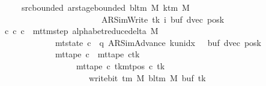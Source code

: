 \begin{isabellebody}
\ \ \ \ \ \ \ src{\isacharunderscore}{\kern0pt}bounded{\isacharcolon}{\kern0pt}\ {\isachardoublequoteopen}ar{\isacharunderscore}{\kern0pt}stage{\isacharunderscore}{\kern0pt}bounded\ {\isacharparenleft}{\kern0pt}bl{\isacharunderscore}{\kern0pt}tm\ M{\isacharparenright}{\kern0pt}\ {\isacharparenleft}{\kern0pt}k{\isacharunderscore}{\kern0pt}tm\ M{\isacharparenright}{\kern0pt}\isanewline
\ \ \ \ \ \ \ \ \ \ \ \ \ \ \ \ \ \ \ \ \ \ \ \ \ \ {\isacharparenleft}{\kern0pt}AR{\isacharunderscore}{\kern0pt}SimWrite{\isacharcomma}{\kern0pt}\ tk{\isacharcomma}{\kern0pt}\ i{\isacharcomma}{\kern0pt}\ buf{\isacharcomma}{\kern0pt}\ dvec{\isacharcomma}{\kern0pt}\ posk{\isacharparenright}{\kern0pt}{\isachardoublequoteclose}\isanewline
\ \ \ {\isachardoublequoteopen}{\isasymexists}c{\isacharprime}{\kern0pt}{\isacharprime}{\kern0pt}{\isachardot}{\kern0pt}\ {\isacharparenleft}{\kern0pt}c{\isacharprime}{\kern0pt}{\isacharcomma}{\kern0pt}\ c{\isacharprime}{\kern0pt}{\isacharprime}{\kern0pt}{\isacharparenright}{\kern0pt}\ {\isasymin}\ mttm{\isacharunderscore}{\kern0pt}step\ {\isacharparenleft}{\kern0pt}alphabet{\isacharunderscore}{\kern0pt}reduce{\isacharunderscore}{\kern0pt}delta\ M{\isacharparenright}{\kern0pt}\isanewline
\ \ \ \ \ \ \ \ \ \ \ \ \ \ {\isasymand}\ mt{\isacharunderscore}{\kern0pt}state\ c{\isacharprime}{\kern0pt}{\isacharprime}{\kern0pt}\ {\isacharequal}{\kern0pt}\ {\isacharparenleft}{\kern0pt}q{\isacharcomma}{\kern0pt}\ AR{\isacharunderscore}{\kern0pt}SimAdvance{\isacharcomma}{\kern0pt}\ k{\isacharunderscore}{\kern0pt}unidx\ {}{\isacharcomma}{\kern0pt}\ {}{\isacharcomma}{\kern0pt}\ buf{\isacharcomma}{\kern0pt}\ dvec{\isacharcomma}{\kern0pt}\ posk{\isacharparenright}{\kern0pt}\isanewline
\ \ \ \ \ \ \ \ \ \ \ \ \ \ {\isasymand}\ mt{\isacharunderscore}{\kern0pt}tape\ c{\isacharprime}{\kern0pt}{\isacharprime}{\kern0pt}\ {\isacharequal}{\kern0pt}\ {\isacharparenleft}{\kern0pt}mt{\isacharunderscore}{\kern0pt}tape\ c{\isacharprime}{\kern0pt}{\isacharparenright}{\kern0pt}{\isacharparenleft}{\kern0pt}tk\ {\isacharcolon}{\kern0pt}{\isacharequal}{\kern0pt}\isanewline
\ \ \ \ \ \ \ \ \ \ \ \ \ \ \ \ \ \ \ \ {\isacharparenleft}{\kern0pt}mt{\isacharunderscore}{\kern0pt}tape\ c{\isacharprime}{\kern0pt}\ tk{\isacharparenright}{\kern0pt}{\isacharparenleft}{\kern0pt}mt{\isacharunderscore}{\kern0pt}pos\ c{\isacharprime}{\kern0pt}\ tk\ {\isacharcolon}{\kern0pt}{\isacharequal}{\kern0pt}\isanewline
\ \ \ \ \ \ \ \ \ \ \ \ \ \ \ \ \ \ \ \ \ \ \ write{\isacharunderscore}{\kern0pt}bit\ {\isacharparenleft}{\kern0pt}{\isasymGamma}{\isacharunderscore}{\kern0pt}tm\ M{\isacharparenright}{\kern0pt}\ {\isacharparenleft}{\kern0pt}bl{\isacharunderscore}{\kern0pt}tm\ M{\isacharparenright}{\kern0pt}\ {\isacharparenleft}{\kern0pt}buf\ tk{\isacharparenright}{\kern0pt}\isanewline

\end{isabellebody}
